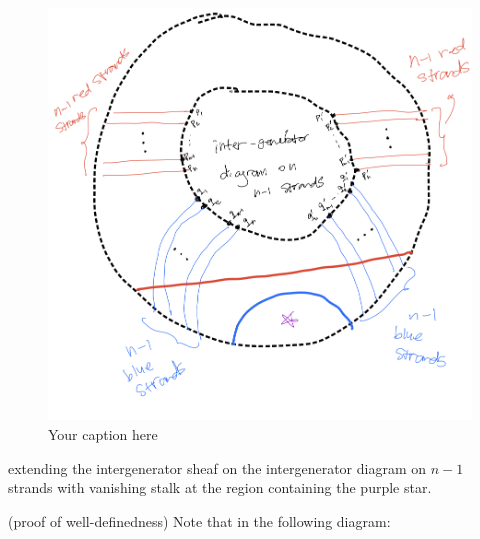 \begin{figure}[H] %
    \centering
    \includegraphics[width=\linewidth]{diagrams/definition14-3/2.png} %
    \caption{Your caption here}
    \label{fig:your-label}
\end{figure}

extending the intergenerator sheaf on the intergenerator diagram on $n-1$ strands with vanishing stalk at the region containing the purple star.

(proof of well-definedness) Note that in the following diagram:

